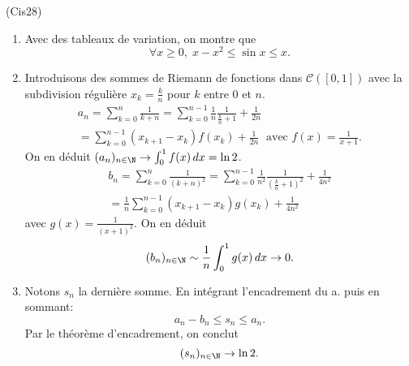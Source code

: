 \begin{tiny}(Cis28)\end{tiny}
\begin{enumerate}
  \item Avec des tableaux de variation, on montre que
\[
  \forall x\geq 0, \; x - x^2 \leq \sin x \leq x.
\]

  \item Introduisons des sommes de Riemann de fonctions dans $\mathcal{C}(\left[ 0,1 \right])$ avec la subdivision régulière $x_k = \frac{k}{n}$ pour $k$ entre $0$ et $n$.
\begin{multline*}
 a_n = \sum_{k=0}^{n} \frac{1}{k + n} = \sum_{k=0}^{n-1} \frac{1}{n}\frac{1}{\frac{k}{n} + 1} + \frac{1}{2n}\\
  = \sum_{k=0}^{n-1}(x_{k+1} - x_k)f(x_k) + \frac{1}{2n}\;
\text{ avec } f(x) = \frac{1}{x+1}. 
\end{multline*}
On en déduit $(a_n)_{n\in \N} \rightarrow \int_0^1 f(x)\,dx = \ln 2$.
\begin{multline*}
 b_n = \sum_{k=0}^{n} \frac{1}{(k + n)^2} = \sum_{k=0}^{n-1} \frac{1}{n^2}\frac{1}{(\frac{k}{n} + 1)^2} + \frac{1}{4n^2}\\
  = \frac{1}{n}\sum_{k=0}^{n-1}(x_{k+1} - x_k)g(x_k) + \frac{1}{4n^2}
\end{multline*}
avec $g(x) = \frac{1}{(x+1)^2}$. On en déduit 
\[
(b_n)_{n\in \N}\sim \frac{1}{n} \int_0^1 g(x)\,dx \rightarrow 0.  
\]

  \item Notons $s_n$ la dernière somme. En intégrant l'encadrement du a. puis en sommant:
\[
  a_n - b_n \leq s_n \leq a_n.
\]
Par le théorème d'encadrement, on conclut
\[
  (s_n)_{n \in \N} \rightarrow \ln 2.
\]

\end{enumerate}

